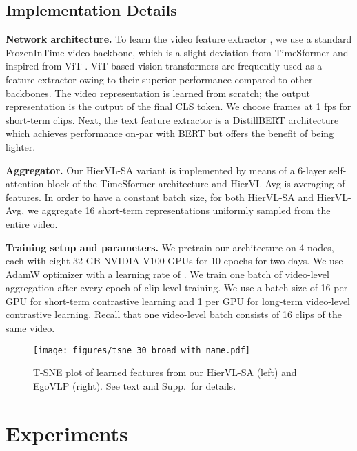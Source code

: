 \documentclass[10pt,twocolumn,letterpaper]{article}
\newcommand{\modelname}[0]{{HierVL}}
\begin{document}
\subsection{Implementation Details}
\label{sec:impl}

\noindent \textbf{Network architecture.} To learn the video feature extractor , we use a standard FrozenInTime \cite{frozenintime} video backbone, which is a slight deviation from TimeSformer \cite{timesformer} and inspired from ViT \cite{vit}. ViT-based vision transformers are frequently used as a feature extractor \cite{egovlp,clip} owing to their superior performance compared to other backbones. The video representation  is learned from scratch; the output representation is the output of the final CLS token. We choose frames at 1 fps for short-term clips.
Next, the text feature extractor  is a DistillBERT \cite{distilbert} architecture which achieves performance on-par with BERT \cite{bert} but offers the benefit of being lighter. 

\noindent \textbf{Aggregator.}  Our HierVL-SA variant is implemented by means of a 6-layer self-attention block of the TimeSformer architecture \cite{timesformer} and \modelname-Avg is averaging of features. In order to have a constant batch size, for both HierVL-SA and HierVL-Avg, we aggregate 16 short-term representations uniformly sampled from the entire video. 


\noindent \textbf{Training setup and parameters.} We pretrain our architecture on 4 nodes, each with eight 32 GB NVIDIA V100 GPUs for 10 epochs for two days. We use AdamW \cite{adamw} optimizer with a learning rate of . We train one batch of video-level aggregation after every  epoch of clip-level training. 
We use a batch size of 16 per GPU for short-term contrastive learning and 1 per GPU for long-term video-level contrastive learning. Recall that one video-level batch consists of 16 clips of the same video.
 \begin{figure}[t]
\centering
\texttt{[image: figures/tsne\_30\_broad\_with\_name.pdf]}
\caption{T-SNE plot of learned features from our \modelname-SA (left) and EgoVLP \cite{egovlp} (right).  See text and Supp.~for details.}

\label{fig:tsne}
\vspace{-0.10in}
\end{figure}




\section{Experiments}
\label{sec:exp}
\end{document}
